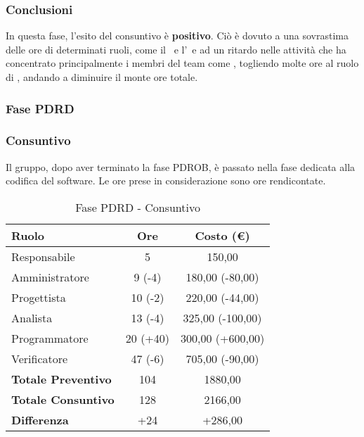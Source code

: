 \documentclass[../PianoProgetto.tex]{subfiles}
\begin{document}
	\subsubsection{Conclusioni}	
     In questa fase, l'esito del consuntivo è \textbf{positivo}. 
     Ciò è dovuto a una sovrastima delle ore di determinati ruoli, come il \responsabilediprogetto\ e l'\analista\, e ad un ritardo nelle attività che ha concentrato principalmente i membri del team come \progettisti, togliendo molte ore al ruolo di \programmatore, andando a diminuire il monte ore totale.
	
	\subsubsection{Fase PDRD}
	\subsubsection{Consuntivo}
	Il gruppo, dopo aver terminato la fase PDROB, è passato nella fase dedicata alla codifica del software\g. Le ore prese in considerazione sono ore rendicontate. 
	
	\begin{table}[h]
		\centering
		\begin{tabular}{l * {2}{c}}
			\toprule
			\textbf{Ruolo} & \textbf{Ore} & \textbf{Costo (\euro{})} \\
			\midrule
			Responsabile &		5 & 150,00  \\
			Amministratore &	9 (-4) & 180,00  (-80,00) \\
			Progettista & 		10 (-2) & 220,00  (-44,00)\\
			Analista & 			13	(-4)	& 325,00   (-100,00)       \\
			Programmatore & 	20	(+40)	& 300,00 	(+600,00)			\\
			Verificatore & 		47 (-6) & 705,00 (-90,00)	\\
			\midrule
			\textbf{Totale Preventivo} & 104
			& 1880,00
			\\		
			\textbf{Totale Consuntivo} & 128 & 2166,00
			\\
			\midrule
			\textbf{Differenza} & +24 & +286,00 \\
			\bottomrule
		\end{tabular}
		
		\caption{Fase PDRD - Consuntivo}
		\label{tab:consuntivoPDRD}
		
	\end{table}			
	
\end{document}
